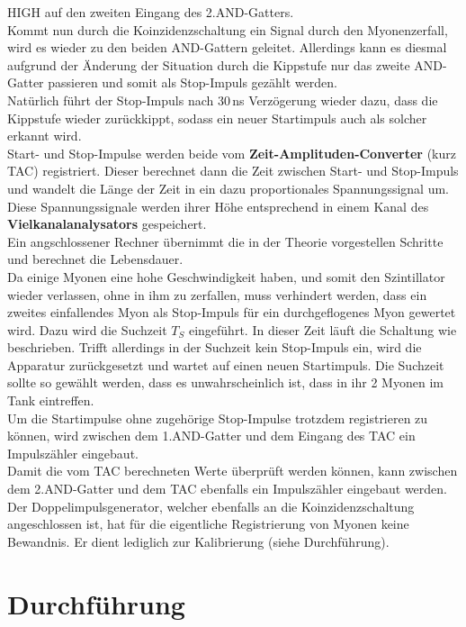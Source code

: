     HIGH auf den zweiten Eingang des 2.AND-Gatters. \\
    Kommt nun durch die Koinzidenzschaltung ein Signal durch den Myonenzerfall,
    wird es wieder zu den beiden AND-Gattern geleitet. Allerdings kann es
    diesmal aufgrund der Änderung der Situation durch die Kippstufe
    nur das zweite AND-Gatter passieren und somit als Stop-Impuls gezählt werden.\\
    Natürlich führt der Stop-Impuls nach 30\,ns Verzögerung wieder dazu, dass
    die Kippstufe wieder zurückkippt, sodass ein neuer Startimpuls auch
    als solcher erkannt wird.\\
    Start- und Stop-Impulse werden beide vom \textbf{Zeit-Amplituden-Converter}
    (kurz TAC) registriert. Dieser berechnet dann die Zeit zwischen Start-
    und Stop-Impuls und wandelt die Länge der Zeit in ein dazu proportionales
    Spannungssignal um. \\
    Diese Spannungssignale werden ihrer Höhe entsprechend in einem Kanal
    des \textbf{Vielkanalanalysators} gespeichert.\\
    Ein angschlossener Rechner übernimmt die in der Theorie vorgestellen
    Schritte und berechnet die Lebensdauer.\\
    Da einige Myonen eine hohe Geschwindigkeit haben, und somit den
    Szintillator wieder verlassen, ohne in ihm zu zerfallen, muss verhindert
    werden, dass ein zweites einfallendes Myon als Stop-Impuls für
    ein durchgeflogenes Myon gewertet wird. Dazu wird die Suchzeit $T_S$
    eingeführt. In dieser Zeit läuft die Schaltung wie beschrieben. Trifft
    allerdings in der Suchzeit kein Stop-Impuls ein, wird die Apparatur
    zurückgesetzt und wartet auf einen neuen Startimpuls.
    Die Suchzeit sollte so gewählt werden, dass es unwahrscheinlich ist,
    dass in ihr 2 Myonen im Tank eintreffen.\\
    Um die Startimpulse ohne zugehörige Stop-Impulse trotzdem registrieren zu
    können, wird zwischen dem 1.AND-Gatter und dem Eingang des
    TAC ein Impulszähler eingebaut.\\
    Damit die vom TAC berechneten Werte überprüft werden können,
    kann zwischen dem 2.AND-Gatter und dem TAC ebenfalls ein Impulszähler
    eingebaut werden.\\
    Der Doppelimpulsgenerator, welcher ebenfalls an die Koinzidenzschaltung
    angeschlossen ist, hat für die eigentliche Registrierung von Myonen
    keine Bewandnis. Er dient lediglich zur Kalibrierung (siehe Durchführung).

  \section{Durchführung}







